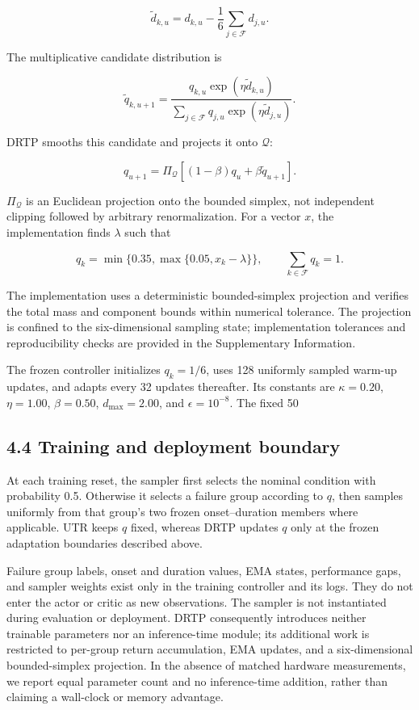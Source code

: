 \[
\tilde d_{k,u}=d_{k,u}-\frac{1}{6}\sum_{j\in\mathcal F}d_{j,u}.
\]

The multiplicative candidate distribution is

\[
\tilde q_{k,u+1}=
\frac{q_{k,u}\exp(\eta\tilde d_{k,u})}
{\sum_{j\in\mathcal F}q_{j,u}\exp(\eta\tilde d_{j,u})}.
\]

DRTP smooths this candidate and projects it onto \(\mathcal Q\):

\[
q_{u+1}=\Pi_{\mathcal Q}\left[(1-\beta)q_u+\beta\tilde q_{u+1}\right].
\]

\(\Pi_{\mathcal Q}\) is an Euclidean projection onto the bounded simplex, not independent clipping followed by arbitrary renormalization. For a vector \(x\), the implementation finds \(\lambda\) such that

\[
q_k=\min\{0.35,\max\{0.05,x_k-\lambda\}\},
\qquad \sum_{k\in\mathcal F}q_k=1.
\]

The implementation uses a deterministic bounded-simplex projection and verifies the total mass and component bounds within numerical tolerance. The projection is confined to the six-dimensional sampling state; implementation tolerances and reproducibility checks are provided in the Supplementary Information.

The frozen controller initializes \(q_k=1/6\), uses 128 uniformly sampled warm-up updates, and adapts every 32 updates thereafter. Its constants are \(\kappa=0.20\), \(\eta=1.00\), \(\beta=0.50\), \(d_{\max}=2.00\), and \(\epsilon=10^{-8}\). The fixed 50%

\subsection{4.4 Training and deployment boundary}

At each training reset, the sampler first selects the nominal condition with probability 0.5. Otherwise it selects a failure group according to \(q\), then samples uniformly from that group's two frozen onset--duration members where applicable. UTR keeps \(q\) fixed, whereas DRTP updates \(q\) only at the frozen adaptation boundaries described above.

Failure group labels, onset and duration values, EMA states, performance gaps, and sampler weights exist only in the training controller and its logs. They do not enter the actor or critic as new observations. The sampler is not instantiated during evaluation or deployment. DRTP consequently introduces neither trainable parameters nor an inference-time module; its additional work is restricted to per-group return accumulation, EMA updates, and a six-dimensional bounded-simplex projection. In the absence of matched hardware measurements, we report equal parameter count and no inference-time addition, rather than claiming a wall-clock or memory advantage.

